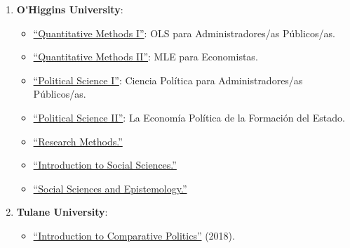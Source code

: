 \begin{enumerate}

\item {\bf O\'\unskip Higgins University}:
  
    \begin{itemize}
      \item[\textcolor{gray}{\textbullet}] \href{https://github.com/hbahamonde/OLS/raw/master/Bahamonde_OLS.pdf}{``Quantitative Methods I''}: {\color{gray}OLS para Administradores/as P\'ublicos/as}.
      \item[\textcolor{gray}{\textbullet}] \href{https://github.com/hbahamonde/MLE/raw/master/Bahamonde_MLE.pdf}{``Quantitative Methods II''}: {\color{gray}MLE para Economistas}.
      \item[\textcolor{gray}{\textbullet}] \href{https://github.com/hbahamonde/Ciencia_Politica_I/raw/master/Bahamonde_Ciencia_Politica_I.pdf}{``Political Science I''}: {\color{gray} Ciencia Pol\'itica para Administradores/as P\'ublicos/as}.
      \item[\textcolor{gray}{\textbullet}] \href{https://github.com/hbahamonde/Ciencia_Politica_II/raw/master/Bahamonde_Ciencia_Politica_II.pdf}{``Political Science II''}: {\color{gray}La Econom\'ia Pol\'itica de la Formaci\'on del Estado}.
      \item[\textcolor{gray}{\textbullet}] \href{https://github.com/hbahamonde/Metodos_de_Investigacion/raw/master/Bahamonde_Metodos_de_Investigacion.pdf}{``Research Methods.''}
      \item[\textcolor{gray}{\textbullet}] \href{https://github.com/hbahamonde/Intro_Ciencias_Sociales/raw/master/Bahamonde_Intro_Ciencias_Sociales.pdf}{``Introduction to Social Sciences.''}
      \item[\textcolor{gray}{\textbullet}] \href{https://github.com/hbahamonde/Social_Sciences_Epistemology_UGRAD/raw/master/Bahamonde_Social_Sciences_Epistemology_UGRAD_Syllabus.pdf}{``Social Sciences and Epistemology.''}
    \end{itemize}

\item {\bf Tulane University}:
  
    \begin{itemize}
      \item[\textcolor{gray}{\textbullet}] \href{https://github.com/hbahamonde/Comparative_Politics_UGRAD/raw/master/Bahamonde_Comparative_Politics_Syllabus_UGRAD.pdf}{``Introduction to Comparative Politics''} (2018).
    \end{itemize}


\end{enumerate}
